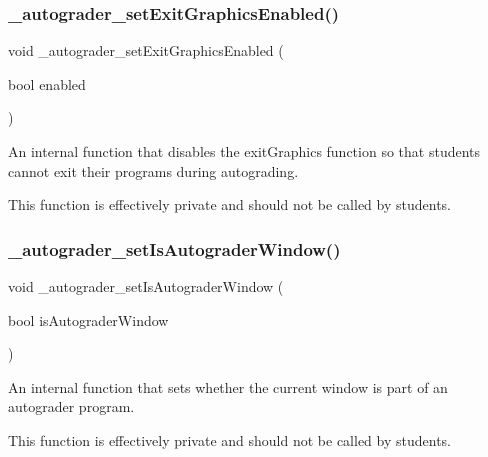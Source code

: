 \subsubsection{\texorpdfstring{\+\_\+autograder\+\_\+set\+Exit\+Graphics\+Enabled()}{\_autograder\_setExitGraphicsEnabled()}}
{\footnotesize\ttfamily void \+\_\+autograder\+\_\+set\+Exit\+Graphics\+Enabled (\begin{DoxyParamCaption}\item[{bool}]{enabled }\end{DoxyParamCaption})\hspace{0.3cm}{\ttfamily [static]}}



An internal function that disables the exit\+Graphics function so that students cannot exit their programs during autograding. 

This function is effectively private and should not be called by students. \mbox{\label{classGWindow_a458811bab688db3875a6806b3ba4d938}} 
\subsubsection{\texorpdfstring{\+\_\+autograder\+\_\+set\+Is\+Autograder\+Window()}{\_autograder\_setIsAutograderWindow()}}
{\footnotesize\ttfamily void \+\_\+autograder\+\_\+set\+Is\+Autograder\+Window (\begin{DoxyParamCaption}\item[{bool}]{is\+Autograder\+Window }\end{DoxyParamCaption})\hspace{0.3cm}{\ttfamily [virtual]}}



An internal function that sets whether the current window is part of an autograder program. 

This function is effectively private and should not be called by students. \mbox{\label{classGWindow_ae51372f06b62dd7ffef8678b147cc70a}} 
